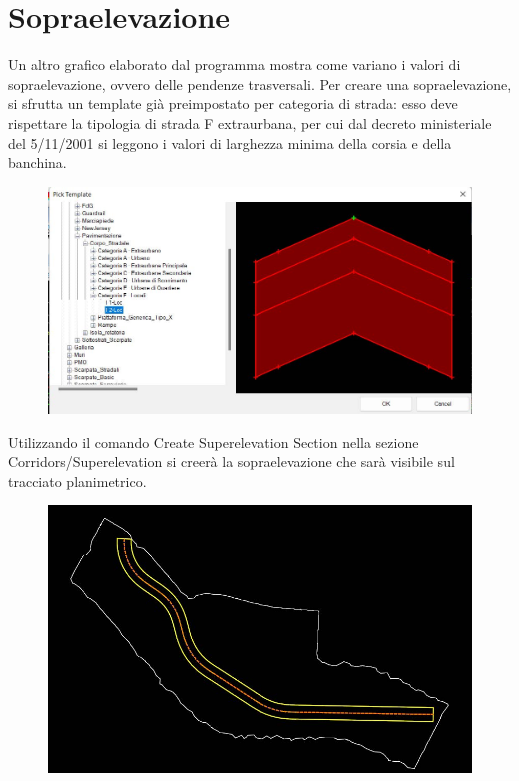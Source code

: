 \chapter{Sopraelevazione}

Un altro grafico elaborato dal programma mostra come variano i valori di sopraelevazione, ovvero delle pendenze trasversali. Per creare una sopraelevazione, si sfrutta un template già preimpostato per categoria di strada: esso deve rispettare la tipologia di strada F extraurbana, per cui dal decreto ministeriale del 5/11/2001 si leggono i valori di larghezza minima della corsia e della banchina.

\begin{figure}[H]
	\centering
	\includegraphics[width=\linewidth]{Figures/template}
    \label{fig:template}
\end{figure}

Utilizzando il comando Create Superelevation Section nella sezione Corridors/Superelevation si creerà la sopraelevazione che sarà visibile sul tracciato planimetrico.

\begin{figure}[H]
	\centering
	\includegraphics[width=\linewidth]{Figures/Sopraelevazione del tracciato vista in pianta}
    \label{fig:Sopraelevazione del tracciato vista in pianta}
\end{figure}

